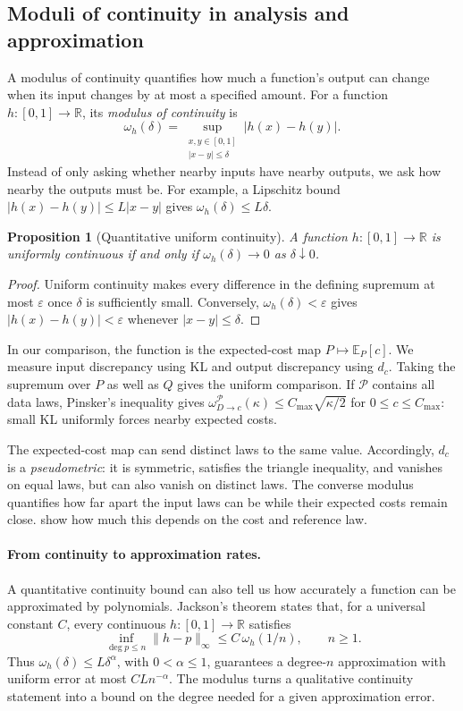 \documentclass[11pt,twoside]{article}
\newcommand{\R}{\mathbb R}
\newcommand{\E}{\mathbb E}
\newtheorem{proposition}[theorem]{Proposition}
\theoremstyle{definition}
\theoremstyle{remark}
\begin{document}
\subsection{Moduli of continuity in analysis and approximation}
\label{app:moduli-analysis}

A modulus of continuity quantifies how much a function's output can
change when its input changes by at most a specified amount. For a
function \(h:[0,1]\to\R\), its \emph{modulus of continuity} is
\[
 \omega_h(\delta)
 =\sup_{\substack{x,y\in[0,1]\\|x-y|\le\delta}}|h(x)-h(y)|.
\]
Instead of only asking whether nearby inputs have nearby outputs, we
ask how nearby the outputs must be. For example, a Lipschitz bound
\(|h(x)-h(y)|\le L|x-y|\) gives \(\omega_h(\delta)\le L\delta\).

\begin{proposition}[Quantitative uniform continuity]
A function \(h:[0,1]\to\R\) is uniformly continuous if and only if
\(\omega_h(\delta)\to0\) as \(\delta\downarrow0\).
\end{proposition}

\begin{proof}
Uniform continuity makes every difference in the defining supremum at
most \(\varepsilon\) once \(\delta\) is sufficiently small. Conversely,
\(\omega_h(\delta)<\varepsilon\) gives
\(|h(x)-h(y)|<\varepsilon\) whenever \(|x-y|\le\delta\).
\end{proof}

In our comparison, the function is the expected-cost map
\(P\mapsto\E_P[c]\). We measure input discrepancy using KL and
output discrepancy using \(d_c\). Taking the supremum over \(P\)
as well as \(Q\) gives the uniform comparison. If \(\mathcal P\)
contains all data laws, Pinsker's inequality gives
\(\omega^{\mathcal P}_{D\to c}(\kappa)\le C_{\max}\sqrt{\kappa/2}\) for
\(0\le c\le C_{\max}\): small KL uniformly forces nearby expected costs.

The expected-cost map can send distinct laws to the same value.
Accordingly, \(d_c\) is a \emph{pseudometric}: it is symmetric,
satisfies the triangle inequality, and vanishes on equal laws, but can
also vanish on distinct laws. The converse modulus quantifies how
far apart the input laws can be while their expected costs remain
close.  show how much
this depends on the cost and reference law.

\paragraph{From continuity to approximation rates.}
A quantitative continuity bound can also tell us how accurately a
function can be approximated by polynomials. Jackson's theorem states
that, for a universal constant \(C\), every continuous
\(h:[0,1]\to\R\) satisfies
\[
 \inf_{\deg p\le n}\|h-p\|_\infty
 \le C\,\omega_h(1/n),\qquad n\ge1.
\]
Thus \(\omega_h(\delta)\le L\delta^\alpha\), with
\(0<\alpha\le1\), guarantees a degree-\(n\) approximation with
uniform error at most \(CLn^{-\alpha}\). The modulus turns a
qualitative continuity statement into a bound on the degree needed
for a given approximation error.
\end{document}
